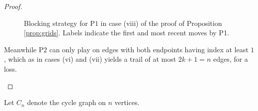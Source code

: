 \documentclass{article}
\theoremstyle{plain}
\theoremstyle{definition}
\def\pone{{\rm{P}\ensuremath{1}}}
\def\ptwo{{\rm{P}\ensuremath{2}}}
\begin{document}
\begin{proof}
\begin{itemize}
\begin{figure}[ht]

    \caption{Blocking strategy for \pone{} in case (viii) of the proof of Proposition \ref{prop:grids}. Labels indicate the first and most recent moves by P1. }
    \label{fig:gridsvii}
\end{figure}
    
    Meanwhile \ptwo{} can only play on edges with both endpoints having index at least $1$, which as in cases (vi) and (vii) yields a trail of at most $2k + 1 = n$ edges, for a loss.  \hfill \qedhere
    \end{itemize}
\end{proof}

Let $C_n$ denote the cycle graph on $n$ vertices.
\end{document}
